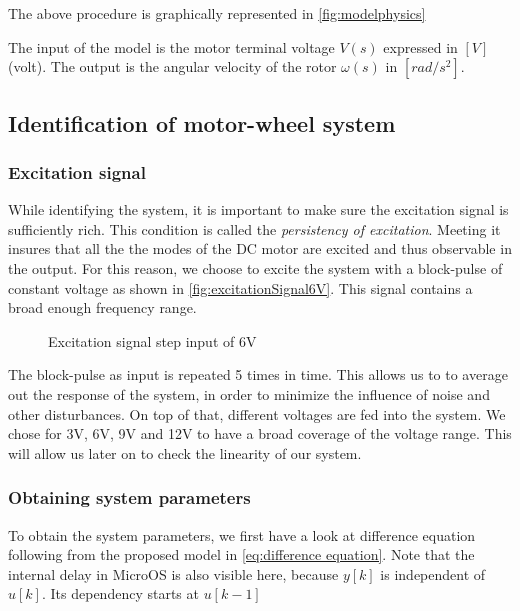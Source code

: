 \documentclass[a4paper]{article}
\newcommand{\newpar}{\vspace{.3cm}\noindent}
\begin{document}
\newpar
The above procedure is graphically represented in \autoref{fig:modelphysics}


\newpar
The input of the model is the motor terminal voltage \(V(s)\) expressed in \([V]\) (volt). The output is the angular velocity of the rotor \(\omega(s)\) in \([rad/s^2]\).

\subsection{Identification of motor-wheel system} \label{motor-wheel}
\subsubsection{Excitation signal}

While identifying the system, it is important to make sure the excitation signal is sufficiently rich. This condition is called the \emph{persistency of excitation}. Meeting it insures that all the the modes of the DC motor are excited and thus observable in the output. For this reason, we choose to excite the system with a block-pulse of constant voltage as shown in \autoref{fig:excitationSignal6V}. This signal contains a broad enough frequency range.

  \begin{figure}[H]
      \caption{Excitation signal step input of 6V}
      \label{fig:excitationSignal6V}
  \end{figure}

\newpar
The block-pulse as input is repeated 5 times in time. This allows us to to average out the response of the system, in order to minimize the influence of noise and other disturbances. On top of that, different voltages are fed into the system. We chose for 3V, 6V, 9V and 12V to have a broad coverage of the voltage range. This will allow us later on to check the linearity of our system. 

\subsubsection{Obtaining system parameters}
To obtain the system parameters, we first have a look at difference equation following from the proposed model in \autoref{eq:difference equation}. Note that the internal delay in MicroOS is also visible here, because $y[k]$ is independent of $u[k]$. Its dependency starts at $u[k-1]$
\end{document}
